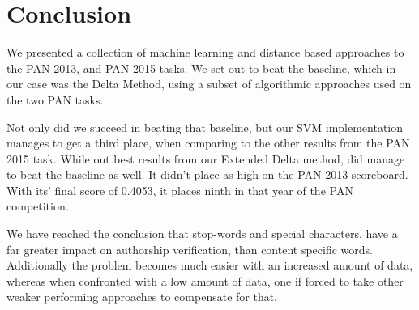 \section{Conclusion} \label{sec:conclusion} 

We presented a collection of machine learning and distance based approaches
to the PAN 2013, and PAN 2015 tasks. We set out to beat the baseline, 
which in our case was the Delta Method, using a subset of algorithmic
approaches used on the two PAN tasks. 

Not only did we succeed in beating that baseline, but our SVM implementation
manages to get a third place, when comparing to the other results from the
PAN 2015 task. While out best results from our Extended Delta method, did
manage to beat the baseline as well. It didn't place as high on the PAN 2013
scoreboard. With its' final score of 0.4053, it places ninth in that year of the
PAN competition.

We have reached the conclusion that stop-words and special characters, have a
far greater impact on authorship verification, than content specific words.
Additionally the problem becomes much easier with an increased amount of data,
whereas when confronted with a low amount of data, one if forced to take other
weaker performing approaches to compensate for that.

